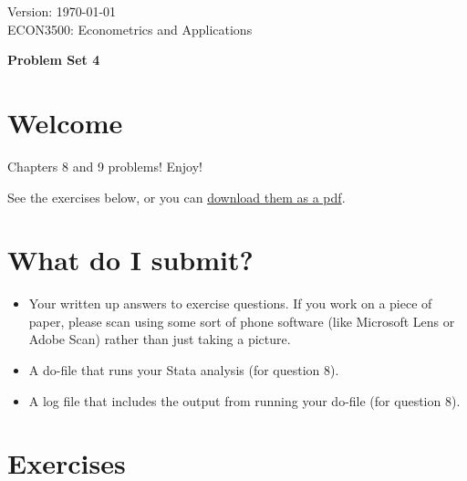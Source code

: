 \documentclass[11pt]{article}
\begin{document}
\thispagestyle{plain}
\singlespacing


Version: \today \hfill \\
ECON3500: Econometrics and Applications
\begin{center}
\Large{\textbf{Problem Set 4}}\\
\end{center}
\bigskip


\hypertarget{welcome}{%
\section*{Welcome}\label{welcome}}

Chapters 8 and 9 problems! Enjoy!

See the exercises below, or you can \href{https://econ3500s26.netlify.app/assignment/04-ps.pdf}{download them as
a pdf}.

\hypertarget{what-do-i-submit}{%
\section*{What do I submit?}\label{what-do-i-submit}}

\begin{itemize}
\item
  Your written up answers to exercise questions. If you work on a piece
  of paper, please scan using some sort of phone software (like
  Microsoft Lens or Adobe Scan) rather than just taking a picture.
\item
  A do-file that runs your Stata analysis (for question 8).
\item
  A log file that includes the output from running your do-file (for
  question 8).
\end{itemize}

\hypertarget{exercises}{%
\section*{Exercises}\label{exercises}}
\end{document}
